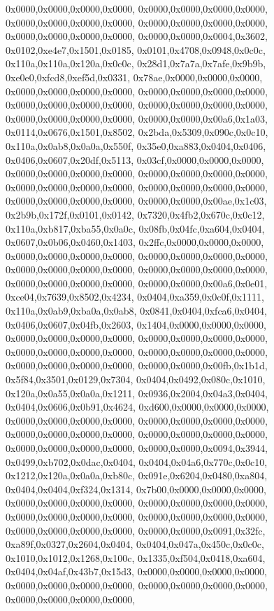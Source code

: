 {	0x0000,0x0000,0x0000,0x0000,
	0x0000,0x0000,0x0000,0x0000,
	0x0000,0x0000,0x0000,0x0000,
	0x0000,0x0000,0x0000,0x0000,
	0x0000,0x0000,0x0000,0x0000,
	0x0000,0x0000,0x0004,0x3602,
	0x0102,0xe4e7,0x1501,0x0185,
	0x0101,0x4708,0x0948,0x0c0c,
	0x110a,0x110a,0x120a,0x0c0c,
	0x28d1,0x7a7a,0x7afe,0x9b9b,
	0xe0e0,0xfcd8,0xef5d,0x0331,
	0x78ae,0x0000,0x0000,0x0000,
	0x0000,0x0000,0x0000,0x0000,
	0x0000,0x0000,0x0000,0x0000,
	0x0000,0x0000,0x0000,0x0000,
	0x0000,0x0000,0x0000,0x0000,
	0x0000,0x0000,0x0000,0x0000,
	0x0000,0x0000,0x00a6,0x1a03,
	0x0114,0x0676,0x1501,0x8502,
	0x2bda,0x5309,0x090c,0x0c10,
	0x110a,0x0ab8,0x0a0a,0x550f,
	0x35e0,0xa883,0x0404,0x0406,
	0x0406,0x0607,0x20df,0x5113,
	0x03cf,0x0000,0x0000,0x0000,
	0x0000,0x0000,0x0000,0x0000,
	0x0000,0x0000,0x0000,0x0000,
	0x0000,0x0000,0x0000,0x0000,
	0x0000,0x0000,0x0000,0x0000,
	0x0000,0x0000,0x0000,0x0000,
	0x0000,0x0000,0x00ae,0x1c03,
	0x2b9b,0x172f,0x0101,0x0142,
	0x7320,0x4fb2,0x670c,0x0c12,
	0x110a,0xb817,0xba55,0x0a0c,
	0x08fb,0x04fc,0xa604,0x0404,
	0x0607,0x0b06,0x0460,0x1403,
	0x2ffc,0x0000,0x0000,0x0000,
	0x0000,0x0000,0x0000,0x0000,
	0x0000,0x0000,0x0000,0x0000,
	0x0000,0x0000,0x0000,0x0000,
	0x0000,0x0000,0x0000,0x0000,
	0x0000,0x0000,0x0000,0x0000,
	0x0000,0x0000,0x00a6,0x0e01,
	0xce04,0x7639,0x8502,0x4234,
	0x0404,0xa359,0x0c0f,0x1111,
	0x110a,0x0ab9,0xba0a,0x0ab8,
	0x0841,0x0404,0xfca6,0x0404,
	0x0406,0x0607,0x04fb,0x2603,
	0x1404,0x0000,0x0000,0x0000,
	0x0000,0x0000,0x0000,0x0000,
	0x0000,0x0000,0x0000,0x0000,
	0x0000,0x0000,0x0000,0x0000,
	0x0000,0x0000,0x0000,0x0000,
	0x0000,0x0000,0x0000,0x0000,
	0x0000,0x0000,0x00fb,0x1b1d,
	0x5f84,0x3501,0x0129,0x7304,
	0x0404,0x0492,0x080c,0x1010,
	0x120a,0x0a55,0x0a0a,0x1211,
	0x0936,0x2004,0x04a3,0x0404,
	0x0404,0x0606,0x0b91,0x4624,
	0xd600,0x0000,0x0000,0x0000,
	0x0000,0x0000,0x0000,0x0000,
	0x0000,0x0000,0x0000,0x0000,
	0x0000,0x0000,0x0000,0x0000,
	0x0000,0x0000,0x0000,0x0000,
	0x0000,0x0000,0x0000,0x0000,
	0x0000,0x0000,0x0094,0x3944,
	0x0499,0xb702,0x0dac,0x0404,
	0x0404,0x04a6,0x770c,0x0c10,
	0x1212,0x120a,0x0a0a,0xb80c,
	0x091e,0x6204,0x0480,0xa804,
	0x0404,0x0404,0xf324,0x1314,
	0x7b00,0x0000,0x0000,0x0000,
	0x0000,0x0000,0x0000,0x0000,
	0x0000,0x0000,0x0000,0x0000,
	0x0000,0x0000,0x0000,0x0000,
	0x0000,0x0000,0x0000,0x0000,
	0x0000,0x0000,0x0000,0x0000,
	0x0000,0x0000,0x0091,0x32fc,
	0xa89f,0x0327,0x2604,0x0404,
	0x0404,0x047a,0x450c,0x0c0c,
	0x1010,0x1012,0x1268,0x100c,
	0x1335,0xf504,0x0418,0xa604,
	0x0404,0x04af,0x43b7,0x15d3,
	0x0000,0x0000,0x0000,0x0000,
	0x0000,0x0000,0x0000,0x0000,
	0x0000,0x0000,0x0000,0x0000,
	0x0000,0x0000,0x0000,0x0000,
}
